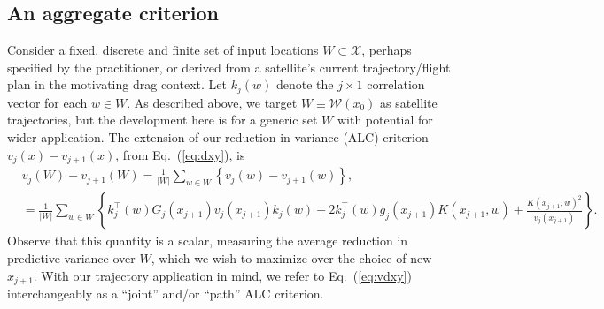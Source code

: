 \documentclass[12pt]{article}
\begin{document}
\subsection{An aggregate criterion}
\label{sec:alcw}

Consider a fixed, discrete and finite set of input locations $W \subset \mathcal{X}$, perhaps
specified by the practitioner, or derived from a satellite's current trajectory/flight plan in the motivating drag context.
Let $k_j(w)$ denote 
the $j \times 1$ correlation vector for each $w \in W$.  As described above, 
we target $W \equiv \mathcal{W}(x_0)$ as satellite trajectories, but the
development here is for a generic set $W$ with potential for wider
application.  %
The extension of our reduction in variance (ALC) criterion 
$v_j(x) - v_{j+1}(x)$, from Eq.~(\ref{eq:dxy}), is
\begin{align}
&v_j(W)- v_{j+1}(W) = \frac{1}{|W|}\sum_{w \in W} \left\{v_j(w)-v_{j+1}(w)\right\}, \label{eq:vdxy} \\
&=  \frac{1}{|W|}\sum_{w \in W} \left\{ k_j^\top(w)G_j(x_{j+1})v_j(x_{j+1})k_j(w) + 2k_j^\top(w)g_j(x_{j+1})K(x_{j+1}, w) + \frac{K(x_{j+1}, w)^2 }{v_j(x_{j+1})} \right\}. \nonumber
\end{align}
Observe that this quantity is a scalar, measuring the average reduction in
predictive variance over $W$, which we wish to maximize over the
choice of new $x_{j+1}$.  With our trajectory application in mind, we refer to
Eq.~(\ref{eq:vdxy}) interchangeably as a ``joint'' and/or ``path'' ALC criterion.
\end{document}
